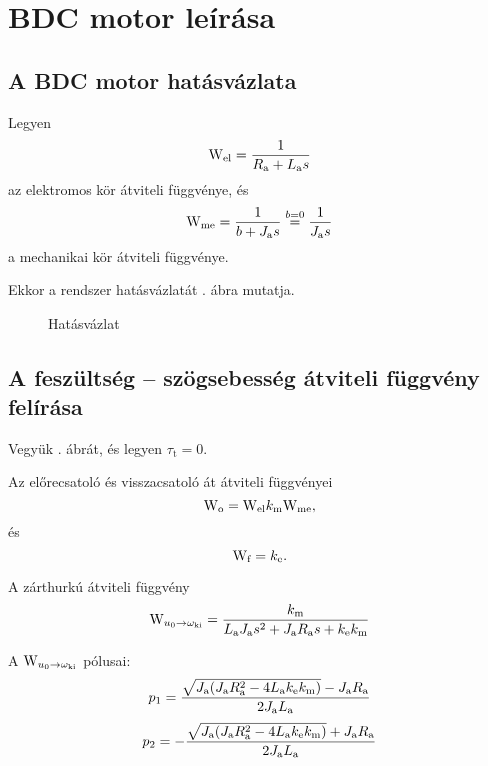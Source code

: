 \section{BDC motor leírása}

\subsection{A BDC motor hatásvázlata}

Legyen
\begin{equation}
	\mathrm{W}_\text{el} = \frac{1}{R_\text{a}  + L_\text{a} s}
\end{equation}
az elektromos kör átviteli függvénye, és
\begin{equation}
	\mathrm{W}_\text{me} = \frac{1}{b + J_\text{a} s} \overset{b=0}{=} \frac{1}{J_\text{a} s}
\end{equation}
a mechanikai kör átviteli függvénye.

Ekkor a rendszer hatásvázlatát . ábra mutatja.

\begin{figure}[h]
	\centering
	\caption{Hatásvázlat}
	\label{fig:hatasvazlat}
\end{figure}

\subsection{A feszültség -- szögsebesség átviteli függvény felírása}
\label{subsect:Wu-w}

Vegyük . ábrát, és legyen $\tau_\text{t}=0$.

Az előrecsatoló és visszacsatoló át átviteli függvényei
\begin{equation}
	\mathrm{W}_\text{o} = \mathrm{W}_\text{el}k_\text{m}\mathrm{W}_\text{me},
\end{equation} és 
\begin{equation}
	\mathrm{W}_\text{f} = k_\text{e}.
\end{equation}

A zárthurkú átviteli függvény
\begin{equation}
	\mathrm{W}_{u_0\rightarrow\omega_\text{ki}} = \frac{k_\text{m} }{L_\text{a}J_\text{a} s^2 + J_\text{a}R_\text{a} s + k_\text{e}k_\text{m}}
\end{equation}

A $\mathrm{W}_{u_0\rightarrow\omega_\text{ki}}$ pólusai:
\begin{equation}
	p_1 = \frac{\sqrt{J_\text{a}(J_\text{a}R_\text{a}^2 - 4L_\text{a}k_\text{e}k_\text{m})} - J_\text{a}R_\text{a}}{2J_\text{a}L_\text{a}}
\end{equation}
\begin{equation}
	p_2 = -\frac{\sqrt{J_\text{a}(J_\text{a}R_\text{a}^2 - 4L_\text{a}k_\text{e}k_\text{m})} + J_\text{a}R_\text{a}}{2J_\text{a}L_\text{a}}
\end{equation}


